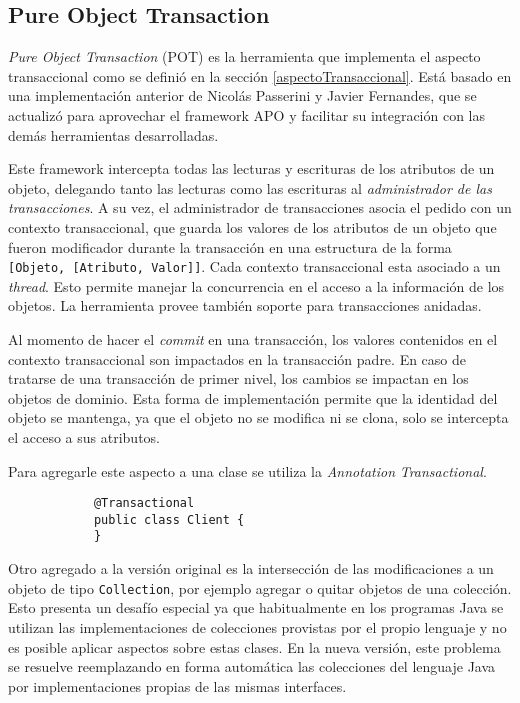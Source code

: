 \subsection{Pure Object Transaction}
	\label{pot} 
	\emph{Pure Object Transaction} (POT) es la herramienta que implementa el
	aspecto transaccional como se definió en la sección \ref{aspectoTransaccional}.
	Está basado en una implementación anterior de Nicolás Passerini y Javier
	Fernandes, que se actualizó para aprovechar el framework APO y facilitar su
	integración con las demás herramientas desarrolladas.
	
	\medskip
	 
	Este framework intercepta todas las lecturas y escrituras de los atributos de
	un objeto, delegando tanto las lecturas como las escrituras al
	\emph{administrador de las transacciones}.
	A su vez, el administrador de transacciones asocia el pedido con un contexto
	transaccional, que guarda los valores de los atributos de un objeto que fueron
	modificador durante la transacción en una estructura de la forma
	\lstinline|[Objeto, [Atributo, Valor]]|.
	Cada contexto transaccional esta asociado a un \emph{thread}. Esto
	permite manejar la concurrencia en el acceso a la información de los objetos.
	La herramienta provee también soporte para transacciones anidadas.
	 
	Al momento de hacer el \emph{commit} en una transacción, los valores
	contenidos en el contexto transaccional son impactados en la transacción
	padre.
	En caso de tratarse de una transacción de primer nivel, los cambios se impactan
	en los objetos de dominio.
	Esta forma de implementación permite que la identidad del objeto se
	mantenga, ya que el objeto no se modifica ni se clona, solo se intercepta el
	acceso a sus atributos.
	
	Para agregarle este aspecto a una clase se utiliza la \emph{Annotation}
	\emph{Transactional}.
			
		\begin{lstlisting} 
			@Transactional
			public class Client {
			}
		\end{lstlisting}
	
	\medskip
	
	Otro agregado a la versión original es la intersección de las modificaciones 
	a un objeto de tipo \lstinline|Collection|, por ejemplo agregar o quitar
	objetos de una colección.
	Esto presenta un desafío especial ya que habitualmente en los programas Java
	se utilizan las implementaciones de colecciones provistas por el propio
	lenguaje y no es posible aplicar aspectos sobre estas clases. 
	En la nueva versión, este problema se resuelve reemplazando en forma
	automática las colecciones del lenguaje Java por
	implementaciones propias de las mismas interfaces.
